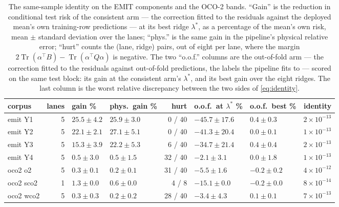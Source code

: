\documentclass[11pt]{article}
\theoremstyle{definition}
\DeclareMathOperator{\Tr}{Tr}
\begin{document}
\begin{table}[t]
\centering\small
\caption{The same-sample identity on the EMIT components and the OCO-2 bands. ``Gain'' is the
reduction in conditional test risk of the consistent arm --- the correction fitted to the residuals
against the deployed mean's own training-row predictions --- at its best ridge $\lambda^*$, as a
percentage of the mean's own risk, mean $\pm$ standard deviation over the lanes; ``phys.'' is the
same gain in the pipeline's physical relative error; ``hurt'' counts the (lane, ridge) pairs, out of
eight per lane, where the margin $2\Tr(\alpha^\top B)-\Tr(\alpha^\top Q\alpha)$ is negative. The two
``o.o.f.'' columns are the out-of-fold arm --- the correction fitted to the residuals against
out-of-fold predictions, the labels the pipeline fits to --- scored on the same test block: its gain
at the consistent arm's $\lambda^*$, and its best gain over the eight ridges. The last column is the
worst relative discrepancy between the two sides of \eqref{eq:identity}.}
\label{tab:corr}
{\small\setlength{\tabcolsep}{4pt}
\begin{tabular}{lrllrllr}
\toprule
corpus & lanes & gain \% & phys.\ gain \% & hurt & o.o.f.\ at $\lambda^*$ \% & o.o.f.\ best \% &
identity\\
\midrule
emit Y1 & 5 & $25.5\pm4.2$ & $25.9\pm3.0$ & 0 / 40 & $-45.7\pm17.6$ & $0.4\pm0.3$ & $2\times10^{-13}$\\
emit Y2 & 5 & $22.1\pm2.1$ & $27.1\pm5.1$ & 0 / 40 & $-41.3\pm20.4$ & $0.0\pm0.1$ & $1\times10^{-13}$\\
emit Y3 & 5 & $15.3\pm3.9$ & $22.2\pm5.3$ & 6 / 40 & $-34.7\pm21.4$ & $0.4\pm0.4$ & $2\times10^{-13}$\\
emit Y4 & 5 & $0.5\pm3.0$ & $0.5\pm1.5$ & 32 / 40 & $-2.1\pm3.1$ & $0.0\pm1.8$ & $1\times10^{-13}$\\
oco2 o2 & 5 & $0.3\pm0.1$ & $0.2\pm0.1$ & 31 / 40 & $-5.5\pm1.6$ & $-0.2\pm0.2$ & $4\times10^{-12}$\\
oco2 sco2 & 1 & $1.3\pm0.0$ & $0.6\pm0.0$ & 4 / 8 & $-15.1\pm0.0$ & $-0.2\pm0.0$ & $8\times10^{-14}$\\
oco2 wco2 & 5 & $0.3\pm0.3$ & $0.2\pm0.2$ & 28 / 40 & $-3.4\pm4.3$ & $0.1\pm0.1$ & $7\times10^{-13}$\\
\bottomrule
\end{tabular}}
\end{table}
\end{document}
